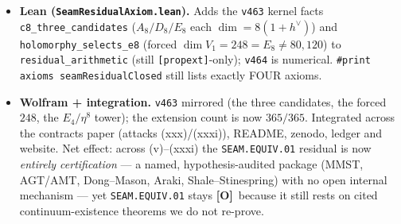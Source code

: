 \documentclass[11pt]{article}
\providecommand{\mE}{\textbf{[E]}}\providecommand{\mC}{\textbf{[C]}}
\providecommand{\mO}{\textbf{[O]}}\providecommand{\mX}{\textbf{[X]}}
\begin{document}
\begin{itemize}
($\max|P_{2N}{-}P_N|{\sim}1/N{\to}0$). \mE\ the limit is $c{=}1$ Dirac: entanglement $S(L){=}(c/3)\ln L$ gives
$c{\to}1$, $16$ copies $\Rightarrow c_-{=}8$ (ties \texttt{v450}). \mC\ Shale--Stinespring makes the Bogoliubov map
implementable, so $R_1$ is upgraded from a bald axiom to ``the unique quasi-free realisation, modulo the named CAR
functor''. Python-only (numpy).
\item \textbf{Lean (\texttt{SeamResidualAxiom.lean}).} Adds the \texttt{v463} kernel facts
\texttt{c8\_three\_candidates} ($A_8/D_8/E_8$ each $\dim{=}8(1{+}h^\vee)$) and \texttt{holomorphy\_selects\_e8}
(forced $\dim V_1{=}248{=}E_8 \neq 80,120$) to \texttt{residual\_arithmetic} (still \texttt{[propext]}-only); \texttt{v464}
is numerical. \texttt{\#print axioms seamResidualClosed} still lists exactly FOUR axioms.
\item \textbf{Wolfram + integration.} \texttt{v463} mirrored (the three candidates, the forced $248$, the $E_4/\eta^8$
tower); the extension count is now $365/365$. Integrated across the contracts paper (attacks (xxx)/(xxxi)), README,
zenodo, ledger and website. Net effect: across (v)--(xxxi) the \texttt{SEAM.EQUIV.01} residual is now \emph{entirely
certification} --- a named, hypothesis-audited package (MMST, AGT/AMT, Dong--Mason, Araki, Shale--Stinespring) with no
open internal mechanism --- yet \texttt{SEAM.EQUIV.01} stays \mO\ because it still rests on cited continuum-existence
theorems we do not re-prove.
\end{itemize}
\end{document}
